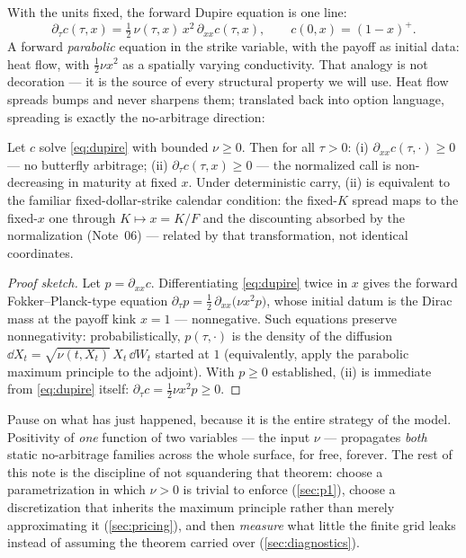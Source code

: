 \documentclass[11pt]{article}
\begin{document}
With the units fixed, the forward Dupire equation is one line:
\begin{equation}
\boxed{\;\partial_\tau c(\tau,x)=\tfrac12\,\nu(\tau,x)\,x^{2}\,
\partial_{xx}c(\tau,x),
\qquad c(0,x)=(1-x)^{+}.\;}
\label{eq:dupire}
\end{equation}
A forward \emph{parabolic} equation in the strike variable, with the payoff
as initial data: heat flow, with $\tfrac12\nu x^{2}$ as a spatially varying
conductivity.  That analogy is not decoration --- it is the source of every
structural property we will use.  Heat flow spreads bumps and never sharpens
them; translated back into option language, spreading is exactly the
no-arbitrage direction:

\begin{proposition}
\label{prop:propagate}
Let $c$ solve \eqref{eq:dupire} with bounded $\nu\ge0$.  Then for all
$\tau>0$: (i) $\partial_{xx}c(\tau,\cdot)\ge0$ --- no butterfly arbitrage;
(ii) $\partial_\tau c(\tau,x)\ge0$ --- the normalized call is
non-decreasing in maturity at fixed $x$.  Under deterministic carry, (ii)
is equivalent to the familiar fixed-dollar-strike calendar condition: the
fixed-$K$ spread maps to the fixed-$x$ one through $K\mapsto x=K/F$ and the
discounting absorbed by the normalization (Note~06) --- related by that
transformation, not identical coordinates.
\end{proposition}

\begin{proof}[Proof sketch]
Let $p=\partial_{xx}c$.  Differentiating \eqref{eq:dupire} twice in $x$
gives the forward Fokker--Planck-type equation
$\partial_\tau p=\tfrac12\,\partial_{xx}\big(\nu x^{2}p\big)$, whose initial
datum is the Dirac mass at the payoff kink $x=1$ --- nonnegative.  Such
equations preserve nonnegativity: probabilistically, $p(\tau,\cdot)$ is the
density of the diffusion $\dd X_t=\sqrt{\nu(t,X_t)}\,X_t\,\dd W_t$ started
at $1$ (equivalently, apply the parabolic maximum principle to the
adjoint).  With $p\ge0$ established, (ii) is immediate from
\eqref{eq:dupire} itself: $\partial_\tau c=\tfrac12\nu x^{2}p\ge0$.
\end{proof}

Pause on what has just happened, because it is the entire strategy of the
model.  Positivity of \emph{one} function of two variables --- the input
$\nu$ --- propagates \emph{both} static no-arbitrage families across the
whole surface, for free, forever.  The rest of this note is the discipline
of not squandering that theorem: choose a parametrization in which
$\nu>0$ is trivial to enforce (\cref{sec:p1}), choose a discretization that
inherits the maximum principle rather than merely approximating it
(\cref{sec:pricing}), and then \emph{measure} what little the finite grid
leaks instead of assuming the theorem carried over
(\cref{sec:diagnostics}).
\end{document}
